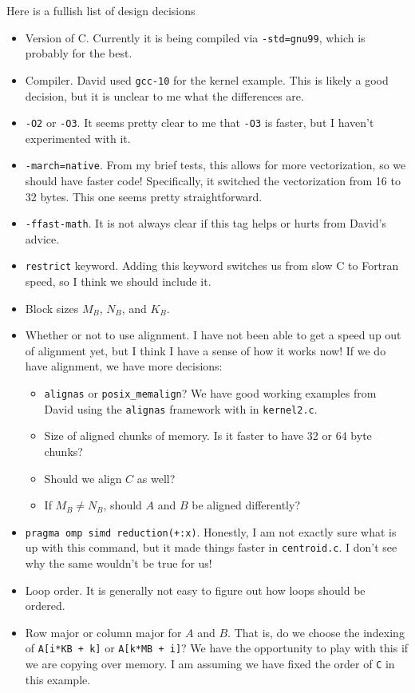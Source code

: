 \documentclass{article}
\begin{document}
Here is a fullish list of design decisions
\begin{itemize}
	\item Version of C. Currently it is being compiled via \texttt{-std=gnu99}, which is probably for the best.
	\item Compiler. David used \texttt{gcc-10} for the kernel example. This is likely a good decision, but it is unclear to me what the differences are.
	\item \texttt{-O2} or \texttt{-O3}. It seems pretty clear to me that \texttt{-O3} is faster, but I haven't experimented with it.
	\item \texttt{-march=native}. From my brief tests, this allows for more vectorization, so we should have faster code! Specifically, it switched the vectorization from 16 to 32 bytes. This one seems pretty straightforward.
	\item \texttt{-ffast-math}. It is not always clear if this tag helps or hurts from David's advice.
	\item \texttt{restrict} keyword. Adding this keyword switches us from slow C to Fortran speed, so I think we should include it.
	\item Block sizes $M_B$, $N_B$, and $K_B$. 
	\item Whether or not to use alignment. I have not been able to get a speed up out of alignment yet, but I think I have a sense of how it works now! If we do have alignment, we have more decisions:
	\begin{itemize}
		\item \texttt{alignas} or \texttt{posix\_memalign}? We have good working examples from David using the \texttt{alignas} framework with in \texttt{kernel2.c}.
		\item Size of aligned chunks of memory. Is it faster to have 32 or 64 byte chunks?
		\item Should we align $C$ as well?
		\item If $M_B \neq N_B$, should $A$ and $B$ be aligned differently?
	\end{itemize}
	\item \texttt{pragma omp simd reduction(+:x)}. Honestly, I am not exactly sure what is up with this command, but it made things faster in \texttt{centroid.c}. I don't see why the same wouldn't be true for us!
	\item Loop order. It is generally not easy to figure out how loops should be ordered.
	\item Row major or column major for $A$ and $B$. That is, do we choose the indexing of \texttt{A[i*KB + k]} or \texttt{A[k*MB + i]}? We have the opportunity to play with this if we are copying over memory. I am assuming we have fixed the order of \texttt{C} in this example.
\end{itemize}
\end{document}
